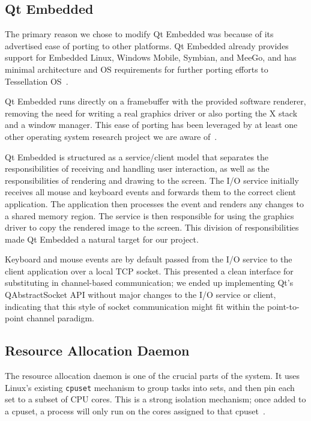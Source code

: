 \documentclass[letterpaper,twocolumn,11pt]{article}
\begin{document}
\subsection{Qt Embedded}

The primary reason we chose to modify Qt Embedded was because of its advertised ease of porting to other platforms. Qt Embedded already provides support for Embedded Linux, Windows Mobile, Symbian, and MeeGo, and has minimal architecture and OS requirements for further porting efforts to Tessellation OS~\cite{qtembedded}.

 Qt Embedded runs directly on a framebuffer with the provided software renderer, removing the need for writing a real graphics driver or also porting the X stack and a window manager. This ease of porting has been leveraged by at least one other operating system research project we are aware of~\cite{ibos}. 

Qt Embedded is structured as a service/client model that separates the responsibilities of receiving and handling user interaction, as well as the responsibilities of rendering and drawing to the screen. The I/O service initially receives all mouse and keyboard events and forwards them to the correct client application. The application then processes the event and renders any changes to a shared memory region. The service is then responsible for using the graphics driver to copy the rendered image to the screen. This division of responsibilities made Qt Embedded a natural target for our project.

Keyboard and mouse events are by default passed from the I/O service to the client application over a local TCP socket. This presented a clean interface for substituting in channel-based communication; we ended up implementing Qt's QAbstractSocket API without major changes to the I/O service or client, indicating that this style of socket communication might fit within the point-to-point channel paradigm.

\subsection{Resource Allocation Daemon}

The resource allocation daemon is one of the crucial parts of the system. It uses Linux's existing {\tt cpuset} mechanism to group tasks into sets, and then pin each set to a subset of CPU cores. This is a strong isolation mechanism; once added to a cpuset, a process will only run on the cores assigned to that cpuset~\cite{cpusets}.
\end{document}
